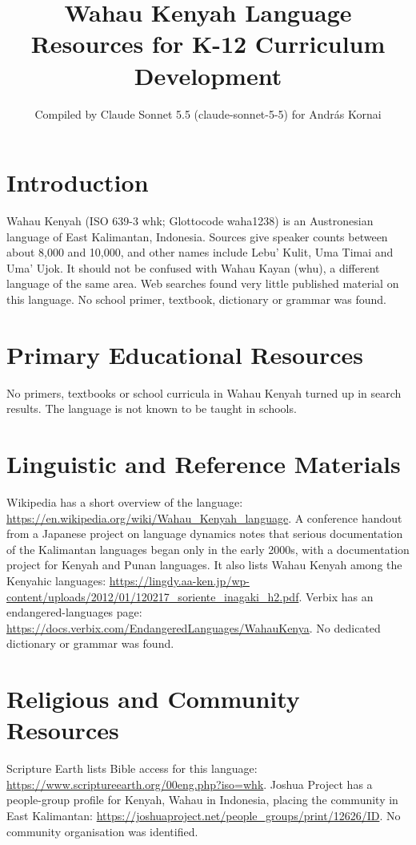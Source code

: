 \documentclass[12pt]{article}
\title{Wahau Kenyah Language Resources for K-12 Curriculum Development}
\author{Compiled by Claude Sonnet 5.5 (claude-sonnet-5-5) for Andr\'as Kornai}
\date{}
\begin{document}
\maketitle

\section{Introduction}
Wahau Kenyah (ISO 639-3 whk; Glottocode waha1238) is an Austronesian language of East Kalimantan, Indonesia. Sources give speaker counts between about 8,000 and 10,000, and other names include Lebu' Kulit, Uma Timai and Uma' Ujok. It should not be confused with Wahau Kayan (whu), a different language of the same area. Web searches found very little published material on this language. No school primer, textbook, dictionary or grammar was found.

\section{Primary Educational Resources}
No primers, textbooks or school curricula in Wahau Kenyah turned up in search results. The language is not known to be taught in schools.

\section{Linguistic and Reference Materials}
Wikipedia has a short overview of the language: \url{https://en.wikipedia.org/wiki/Wahau_Kenyah_language}.
A conference handout from a Japanese project on language dynamics notes that serious documentation of the Kalimantan languages began only in the early 2000s, with a documentation project for Kenyah and Punan languages. It also lists Wahau Kenyah among the Kenyahic languages: \url{https://lingdy.aa-ken.jp/wp-content/uploads/2012/01/120217_soriente_inagaki_h2.pdf}.
Verbix has an endangered-languages page: \url{https://docs.verbix.com/EndangeredLanguages/WahauKenya}.
No dedicated dictionary or grammar was found.

\section{Religious and Community Resources}
Scripture Earth lists Bible access for this language: \url{https://www.scriptureearth.org/00eng.php?iso=whk}.
Joshua Project has a people-group profile for Kenyah, Wahau in Indonesia, placing the community in East Kalimantan: \url{https://joshuaproject.net/people_groups/print/12626/ID}.
No community organisation was identified.
\end{document}
